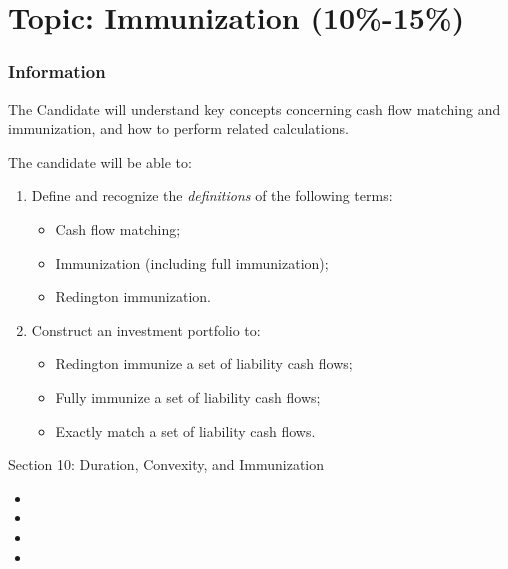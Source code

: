 \chapter[Topic: Immunization]{Topic: Immunization (10\%-15\%)}

\subsection{Information}

\begin{distributions}[Objective]
The Candidate will understand key concepts concerning cash flow matching and immunization, and how to perform related calculations.
\end{distributions}

\begin{outcomes}
The candidate will be able to:
\begin{enumerate}[label = \alph*)]
	\item	Define and recognize the \textit{definitions} of the following terms:
		\begin{itemize}[leftmargin = *]
		\item	Cash flow matching;
		\item	Immunization (including full immunization);
		\item	Redington immunization.
		\end{itemize}
	\item	Construct an investment portfolio to:
		\begin{itemize}[leftmargin = *]
		\item	Redington immunize a set of liability cash flows;
		\item	Fully immunize a set of liability cash flows;
		\item	Exactly match a set of liability cash flows.
		\end{itemize}
\end{enumerate}
\end{outcomes}

\begin{ASM_chapter}
Section 10: Duration, Convexity, and Immunization
\begin{itemize}
	\item	{}
	\item	{}
	\item	{}
	\item	{}
\end{itemize}
\end{ASM_chapter}

